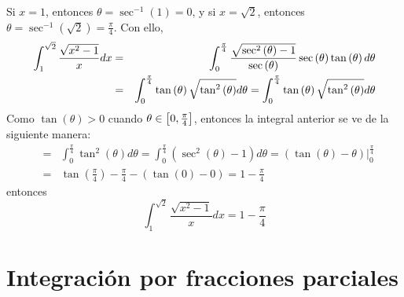 Si $x=1$, entonces $\theta =\sec ^{-1}\left( 1\right) =0$, y si $x=\sqrt{2}$, entonces $\theta =\sec ^{-1}\left( \sqrt{2}\right) =\frac{\pi }{4}$. Con ello,
{\footnotesize
\begin{eqnarray*}
\int_{1}^{\sqrt{2}}\frac{\sqrt{x^{2}-1}}{x}dx &=& \int_{0}^{\frac{\pi }{4%
}} \frac{\sqrt{%
\sec ^{2}\left( \theta \right) -1}}{\sec \left( \theta \right) }\sec \left(
\theta \right) \tan \left( \theta \right) d\theta \\
&=&\int_{0}^{\frac{\pi }{4}} \tan \left( \theta \right) \sqrt{\tan ^{2}\left( \theta
\right) }d\theta =\int_{0}^{\frac{\pi }{4}} \tan \left(
\theta \right) \sqrt{\tan ^{2}\left( \theta \right) }d\theta
\end{eqnarray*}
}
Como $\tan \left( \theta \right) >0$ cuando $\theta \in \left[ 0,\frac{\pi }{%
4}\right] $, entonces la integral anterior se ve de la siguiente manera:
{\small
\begin{eqnarray*}
&=&\int_{0}^{\frac{\pi }{4}} \tan ^{2}\left( \theta \right) d\theta =\int_{0}^{\frac{\pi }{4}} \left( \sec ^{2}\left( \theta \right) -1\right)
d\theta=\left( \tan \left( \theta \right)-\theta \right)\big|_{0}^{\frac{\pi }{4}} \\
&=&\tan \left( \frac{\pi }{4}\right) -\frac{\pi }{4}-\left( \tan \left(
0\right) -0\right) =1-\frac{\pi }{4}
\end{eqnarray*}
}
entonces
\[
\int_{1}^{\sqrt{2}}\frac{\sqrt{x^{2}-1}}{x}dx=1-\frac{\pi }{4}
\]

\section{Integración por fracciones parciales}


